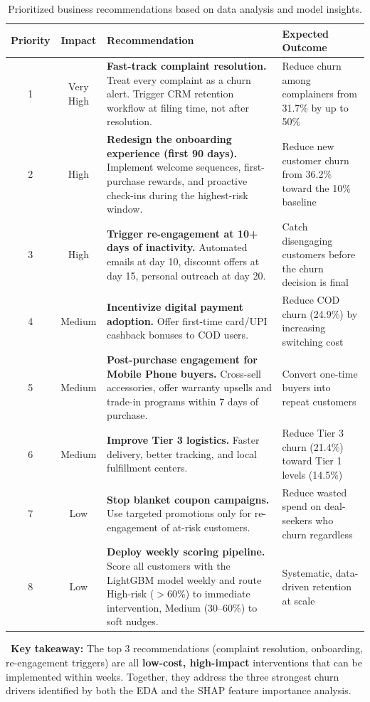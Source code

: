 \documentclass[11pt,a4paper]{article}
\begin{document}
\begin{table}[H]
\centering
{}
\begin{tabularx}{\textwidth}{c c X X}
\toprule
\textbf{Priority} & \textbf{Impact} & \textbf{Recommendation} & \textbf{Expected Outcome} \\
\midrule
1 & Very High & \textbf{Fast-track complaint resolution.} Treat every complaint as a churn alert. Trigger CRM retention workflow at filing time, not after resolution. & Reduce churn among complainers from 31.7\% by up to 50\% \\
2 & High & \textbf{Redesign the onboarding experience (first 90 days).} Implement welcome sequences, first-purchase rewards, and proactive check-ins during the highest-risk window. & Reduce new customer churn from 36.2\% toward the 10\% baseline \\
3 & High & \textbf{Trigger re-engagement at 10+ days of inactivity.} Automated emails at day 10, discount offers at day 15, personal outreach at day 20. & Catch disengaging customers before the churn decision is final \\
4 & Medium & \textbf{Incentivize digital payment adoption.} Offer first-time card/UPI cashback bonuses to COD users. & Reduce COD churn (24.9\%) by increasing switching cost \\
5 & Medium & \textbf{Post-purchase engagement for Mobile Phone buyers.} Cross-sell accessories, offer warranty upsells and trade-in programs within 7 days of purchase. & Convert one-time buyers into repeat customers \\
6 & Medium & \textbf{Improve Tier 3 logistics.} Faster delivery, better tracking, and local fulfillment centers. & Reduce Tier 3 churn (21.4\%) toward Tier 1 levels (14.5\%) \\
7 & Low & \textbf{Stop blanket coupon campaigns.} Use targeted promotions only for re-engagement of at-risk customers. & Reduce wasted spend on deal-seekers who churn regardless \\
8 & Low & \textbf{Deploy weekly scoring pipeline.} Score all customers with the LightGBM model weekly and route High-risk ($>$60\%) to immediate intervention, Medium (30--60\%) to soft nudges. & Systematic, data-driven retention at scale \\
\bottomrule
\end{tabularx}
\caption{Prioritized business recommendations based on data analysis and model insights.}
\end{table}

\begin{infobox}
\faLightbulb\ \textbf{Key takeaway:} The top 3 recommendations (complaint resolution, onboarding, re-engagement triggers) are all \textbf{low-cost, high-impact} interventions that can be implemented within weeks. Together, they address the three strongest churn drivers identified by both the EDA and the SHAP feature importance analysis.
\end{infobox}
\end{document}
